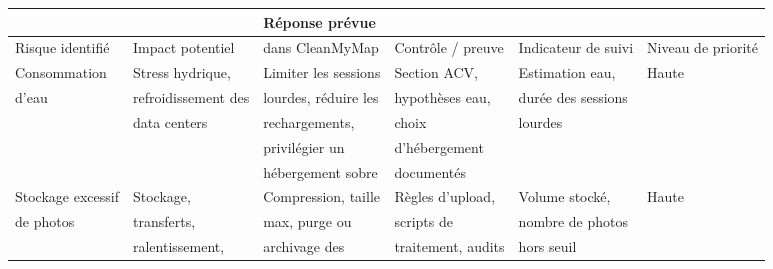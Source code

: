 \documentclass[
  10pt,
  a4paper,
  DIV=11,
  numbers=noendperiod,
  oneside]{scrreprt}
\newcounter{none} %
\begin{document}
{\def\LTcaptype{none} %
\begin{longtable}[]{@{}
  >{\raggedright\arraybackslash}p{}
  >{\raggedright\arraybackslash}p{}
  >{\raggedright\arraybackslash}p{}
  >{\raggedright\arraybackslash}p{}
  >{\raggedright\arraybackslash}p{}
  >{\raggedright\arraybackslash}p{}@{}}
\toprule\noalign{}
\begin{minipage}[b]{\linewidth}\raggedright
\end{minipage} & \begin{minipage}[b]{\linewidth}\raggedright
\end{minipage} & \begin{minipage}[b]{\linewidth}\raggedright
Réponse prévue
\end{minipage} & \begin{minipage}[b]{\linewidth}\raggedright
\end{minipage} & \begin{minipage}[b]{\linewidth}\raggedright
\end{minipage} & \begin{minipage}[b]{\linewidth}\raggedright
\end{minipage} \\
\midrule\noalign{}
\endhead
\bottomrule\noalign{}
\endlastfoot
Risque identifié & Impact potentiel & dans CleanMyMap & Contrôle /
preuve & Indicateur de suivi & Niveau de priorité \\
Consommation & Stress hydrique, & Limiter les sessions & Section ACV, &
Estimation eau, & Haute \\
d'eau & refroidissement des & lourdes, réduire les & hypothèses eau, &
durée des sessions & \\
& data centers & rechargements, & choix & lourdes & \\
& & privilégier un & d'hébergement & & \\
& & hébergement sobre & documentés & & \\
Stockage excessif & Stockage, & Compression, taille & Règles d'upload, &
Volume stocké, & Haute \\
de photos & transferts, & max, purge ou & scripts de & nombre de photos
& \\
& ralentissement, & archivage des & traitement, audits & hors seuil & \\

\end{longtable}}
\end{document}
